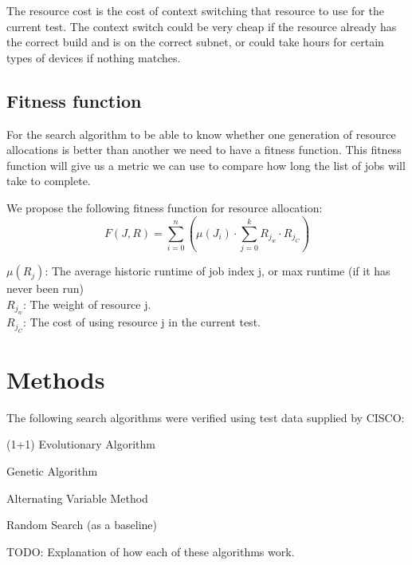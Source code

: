 \documentclass[twoside]{article}
\begin{document}
\begin{multicols}{2}
The resource cost is the cost of context switching that resource to use for the
current test. The context switch could be very cheap if the resource already
has the correct build and is on the correct subnet, or could take hours for
certain types of devices if nothing matches.


\subsection{Fitness function}

For the search algorithm to be able to know whether one generation of resource
allocations is better than another we need to have a fitness function. This
fitness function will give us a metric we can use to compare how long the list
of jobs will take to complete.

We propose the following fitness function for resource allocation:
\begin{equation}\label{fitness_func}
F(J, R) = \sum_{i=0}^{n}{\left( \mu \left(J_{i}\right) \cdot \sum_{j=0}^{k}{R_{j_w} \cdot R_{j_C} } \right)}
\end{equation}

\noindent $\mu (R_j)$: The average historic runtime of job index j, or max runtime (if it has
never been run) \\
\noindent $R_{j_w}$: The weight of resource j.\\
\noindent $R_{j_C}$: The cost of using resource j in the current test.


\section{Methods}

The following search algorithms were verified using test data supplied by CISCO:

\begin{compactitem}
\item (1+1) Evolutionary Algorithm
\item Genetic Algorithm
\item Alternating Variable Method
\item Random Search (as a baseline)
\end{compactitem}

TODO: Explanation of how each of these algorithms work.


\end{multicols}
\end{document}
